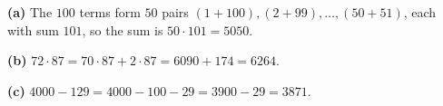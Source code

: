 \textbf{(a)} The $100$ terms form $50$ pairs $(1+100),(2+99),\dots,(50+51)$, each with sum $101$, so the sum is $50\cdot101=\boxed{5050}$.

\textbf{(b)} $72\cdot87=70\cdot87+2\cdot87=6090+174=\boxed{6264}$.

\textbf{(c)} $4000-129=4000-100-29=3900-29=\boxed{3871}$.
